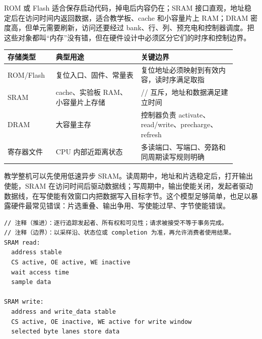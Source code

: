 ROM 或 Flash 适合保存启动代码，掉电后内容仍在；SRAM 接口直观，地址稳定后在访问时间内返回数据，适合教学板、cache 和小容量片上 RAM；DRAM 密度高，但单元需要刷新，访问还要经过 bank、行、列、预充电和控制器调度。把这些对象都叫“内存”没有错，但在硬件设计中必须区分它们的时序和控制边界。

\begin{longtable}{L{0.18\linewidth}L{0.34\linewidth}L{0.38\linewidth}}
\toprule
存储类型 & 典型用途 & 关键边界 \\
\midrule
ROM/Flash & 复位入口、固件、常量表 & 复位地址必须映射到有效内容，读时序满足取指 \\\tablerowrule
SRAM & cache、实验板 RAM、小容量片上存储 & // 互斥，地址和数据满足建立时间 \\\tablerowrule
DRAM & 大容量主存 & 控制器负责 activate、read/write、precharge、refresh \\\tablerowrule
寄存器文件 & CPU 内部近距离状态 & 多读端口、写端口、旁路和同周期读写规则明确 \\
\bottomrule
\end{longtable}

教学整机可以先使用低速异步 SRAM。读周期中，地址和片选稳定后，打开输出使能，SRAM 在访问时间后驱动数据线；写周期中，输出使能关闭，发起者驱动数据线，在写使能有效窗口内把数据写入目标字节。这个模型足够简单，也足以暴露硬件最常见错误：片选重叠、输出争用、写使能过早、字节使能错误。

\begin{lstlisting}
// 注释（推进）：逐行追踪发起者、所有权和可见性；请求被接受不等于事务完成。
// 注释（边界）：以采样沿、状态位或 completion 为准，再允许消费者使用结果。
SRAM read:
  address stable
  CS active, OE active, WE inactive
  wait access time
  sample data

SRAM write:
  address and write_data stable
  CS active, OE inactive, WE active for write window
  selected byte lanes store data
\end{lstlisting}

